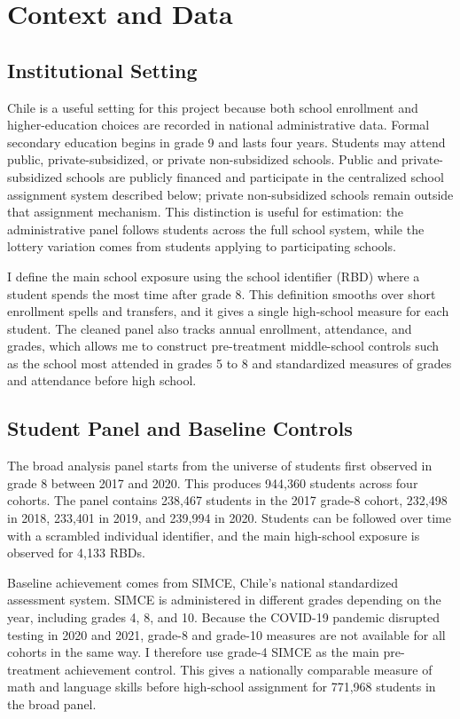 \documentclass[a4paper, article, english, oneside, unknownkeysallowed, 12pt]{memoir}
\begin{document}
\clearpage
\section{Context and Data}

\subsection{Institutional Setting}

Chile is a useful setting for this project because both school enrollment and higher-education choices are recorded in national administrative data. Formal secondary education begins in grade 9 and lasts four years. Students may attend public, private-subsidized, or private non-subsidized schools. Public and private-subsidized schools are publicly financed and participate in the centralized school assignment system described below; private non-subsidized schools remain outside that assignment mechanism. This distinction is useful for estimation: the administrative panel follows students across the full school system, while the lottery variation comes from students applying to participating schools.

I define the main school exposure using the school identifier (RBD) where a student spends the most time after grade 8. This definition smooths over short enrollment spells and transfers, and it gives a single high-school measure for each student. The cleaned panel also tracks annual enrollment, attendance, and grades, which allows me to construct pre-treatment middle-school controls such as the school most attended in grades 5 to 8 and standardized measures of grades and attendance before high school.

\subsection{Student Panel and Baseline Controls}

The broad analysis panel starts from the universe of students first observed in grade 8 between 2017 and 2020. This produces 944,360 students across four cohorts. The panel contains 238,467 students in the 2017 grade-8 cohort, 232,498 in 2018, 233,401 in 2019, and 239,994 in 2020. Students can be followed over time with a scrambled individual identifier, and the main high-school exposure is observed for 4,133 RBDs.

Baseline achievement comes from SIMCE, Chile's national standardized assessment system. SIMCE is administered in different grades depending on the year, including grades 4, 8, and 10. Because the COVID-19 pandemic disrupted testing in 2020 and 2021, grade-8 and grade-10 measures are not available for all cohorts in the same way. I therefore use grade-4 SIMCE as the main pre-treatment achievement control. This gives a nationally comparable measure of math and language skills before high-school assignment for 771,968 students in the broad panel.
\end{document}
